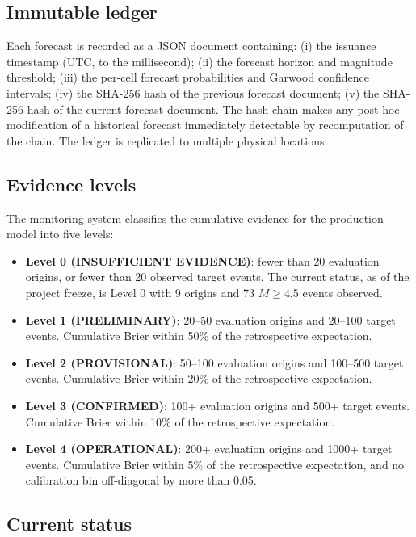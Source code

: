 \documentclass[10pt,a4paper,twocolumn]{article}
\begin{document}
\subsection{Immutable ledger}

Each forecast is recorded as a JSON document containing: (i) the issuance timestamp (UTC, to the millisecond); (ii) the forecast horizon and magnitude threshold; (iii) the per-cell forecast probabilities and Garwood confidence intervals; (iv) the SHA-256 hash of the previous forecast document; (v) the SHA-256 hash of the current forecast document. The hash chain makes any post-hoc modification of a historical forecast immediately detectable by recomputation of the chain. The ledger is replicated to multiple physical locations.

\subsection{Evidence levels}

The monitoring system classifies the cumulative evidence for the production model into five levels:

\begin{itemize}[leftmargin=1.2em,itemsep=2pt,topsep=2pt]
\item \textbf{Level 0 (INSUFFICIENT EVIDENCE)}: fewer than 20 evaluation origins, or fewer than 20 observed target events. The current status, as of the project freeze, is Level 0 with 9 origins and 73 $M\geq4.5$ events observed.
\item \textbf{Level 1 (PRELIMINARY)}: 20--50 evaluation origins and 20--100 target events. Cumulative Brier within 50\% of the retrospective expectation.
\item \textbf{Level 2 (PROVISIONAL)}: 50--100 evaluation origins and 100--500 target events. Cumulative Brier within 20\% of the retrospective expectation.
\item \textbf{Level 3 (CONFIRMED)}: 100+ evaluation origins and 500+ target events. Cumulative Brier within 10\% of the retrospective expectation.
\item \textbf{Level 4 (OPERATIONAL)}: 200+ evaluation origins and 1000+ target events. Cumulative Brier within 5\% of the retrospective expectation, and no calibration bin off-diagonal by more than 0.05.
\end{itemize}

\subsection{Current status}
\end{document}
